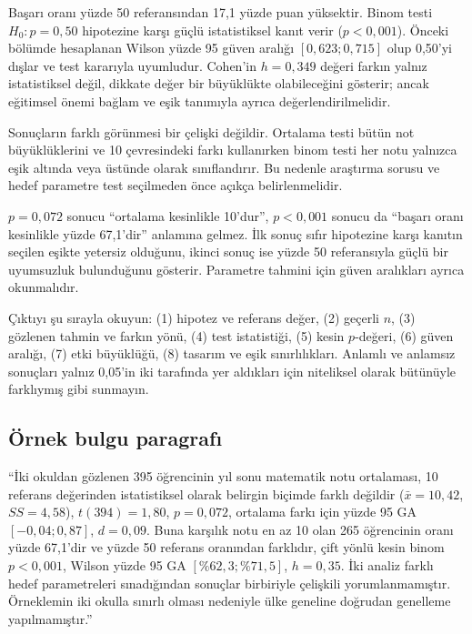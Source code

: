 Başarı oranı yüzde 50 referansından 17,1 yüzde puan yüksektir. Binom testi
$H_0:p=0{,}50$ hipotezine karşı güçlü istatistiksel kanıt verir
($p<0{,}001$). Önceki bölümde hesaplanan Wilson yüzde 95 güven aralığı
$[0{,}623;0{,}715]$ olup 0,50'yi dışlar ve test kararıyla uyumludur.
Cohen'in $h=0{,}349$ değeri farkın yalnız istatistiksel değil, dikkate değer
bir büyüklükte olabileceğini gösterir; ancak eğitimsel önemi bağlam ve eşik
tanımıyla ayrıca değerlendirilmelidir.

Sonuçların farklı görünmesi bir çelişki değildir. Ortalama testi bütün not
büyüklüklerini ve 10 çevresindeki farkı kullanırken binom testi her notu
yalnızca eşik altında veya üstünde olarak sınıflandırır. Bu nedenle araştırma
sorusu ve hedef parametre test seçilmeden önce açıkça belirlenmelidir.

\begin{mistakebox}
$p=0{,}072$ sonucu ``ortalama kesinlikle 10'dur'', $p<0{,}001$ sonucu da
``başarı oranı kesinlikle yüzde 67,1'dir'' anlamına gelmez. İlk sonuç sıfır
hipotezine karşı kanıtın seçilen eşikte yetersiz olduğunu, ikinci sonuç ise
yüzde 50 referansıyla güçlü bir uyumsuzluk bulunduğunu gösterir. Parametre
tahmini için güven aralıkları ayrıca okunmalıdır.
\end{mistakebox}

\begin{outputguidebox}
Çıktıyı şu sırayla okuyun: (1) hipotez ve referans değer, (2) geçerli $n$,
(3) gözlenen tahmin ve farkın yönü, (4) test istatistiği, (5) kesin
$p$-değeri, (6) güven aralığı, (7) etki büyüklüğü, (8) tasarım ve eşik
sınırlılıkları. Anlamlı ve anlamsız sonuçları yalnız 0,05'in iki tarafında
yer aldıkları için niteliksel olarak bütünüyle farklıymış gibi sunmayın.
\end{outputguidebox}

\subsection{Örnek bulgu paragrafı}

``İki okuldan gözlenen 395 öğrencinin yıl sonu matematik notu ortalaması,
10 referans değerinden istatistiksel olarak belirgin biçimde farklı değildir
($\bar x=10{,}42$, $SS=4{,}58$), $t(394)=1{,}80$, $p=0{,}072$, ortalama
farkı için yüzde 95 GA $[-0{,}04;0{,}87]$, $d=0{,}09$. Buna karşılık notu en
az 10 olan 265 öğrencinin oranı yüzde 67,1'dir ve yüzde 50 referans oranından
farklıdır, çift yönlü kesin binom $p<0{,}001$, Wilson yüzde 95 GA
$[\%62{,}3;\%71{,}5]$, $h=0{,}35$. İki analiz farklı hedef parametreleri
sınadığından sonuçlar birbiriyle çelişkili yorumlanmamıştır. Örneklemin iki
okulla sınırlı olması nedeniyle ülke geneline doğrudan genelleme
yapılmamıştır.''

